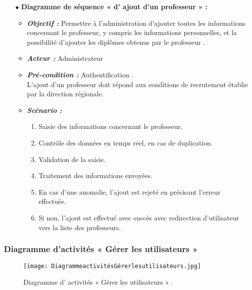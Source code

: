 \begin{itemize}
	\item[$\bullet$] \textbf{Diagramme de séquence « d' ajout d'un professeur » :} 
	\medskip
	\begin{itemize}
		\item \textit{\textbf{Objectif :}} Permettre à l’administration d’ajouter toutes les informations
		concernant le professeur, y compris les informations personnelles, et la possibilité
		d’ajouter les diplômes obtenus par le professeur .	
		\item \textit{\textbf{Acteur :}} Administrateur	
		\item \textit{\textbf{Pré-condition  :}} Authentification .\\
		L’ajout d’un professeur doit répond aux conditions de recrutement établie par la direction régionale.
		\item \textit{\textbf{Scénario :}}
		\begin{enumerate}
			\item Saisie des informations concernant le professeur.
		\item Contrôle des données en temps réel, en cas de duplication.
		\item Validation de la saisie.
		\item Traitement des informations envoyées.
		\item En cas d’une anomalie, l’ajout est rejeté en précisant l’erreur effectuée.
		\item Si non, l’ajout est effectué avec succès avec redirection d’utilisateur vers la liste des
			professeurs.
		\end{enumerate}
	\end{itemize}
\end{itemize}	
\bigskip








\subsubsection{Diagramme d’activités « Gérer les utilisateurs » }
\begin{figure}[ht]
	\centering
	\texttt{[image: DiagrammeactivitésGérerlesutilisateurs.jpg]}
	\caption{Diagramme d' activités  « Gérer les utilisateurs »  .}
	\label{fig:Diagramme d' activités  Gérer les utilisateurs  }
\end{figure}
\FloatBarrier

